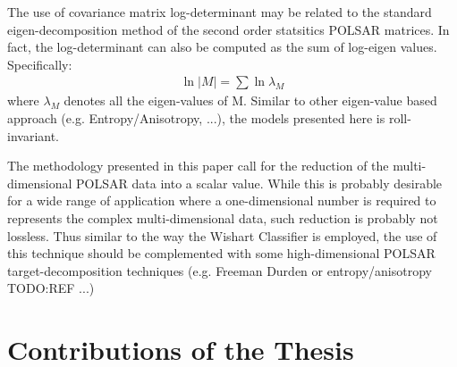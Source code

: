 The use of covariance matrix log-determinant may be related to the standard eigen-decomposition method of the second order statsitics POLSAR matrices.
In fact, the log-determinant can also be computed as the sum of log-eigen values.
Specifically:
\begin{eqnarray}
  \ln{|M|} = \sum \ln{\lambda_M}
\end{eqnarray}
where $\lambda_M$ denotes all the eigen-values of M.
Similar to other eigen-value based approach (e.g. Entropy/Anisotropy, ...),
  the models presented here is roll-invariant.

The methodology presented in this paper call for the reduction of the multi-dimensional POLSAR data into a scalar value.
While this is probably desirable for a wide range of application where a one-dimensional number is required to represents the complex multi-dimensional data,
  such reduction is probably not lossless.
Thus similar to the way the Wishart Classifier is employed,
  the use of this technique should be complemented with some high-dimensional POLSAR target-decomposition techniques (e.g. Freeman Durden or entropy/anisotropy TODO:REF ...)

\section{Contributions of the Thesis}
\label{sec:conclusion_contribution}
        

